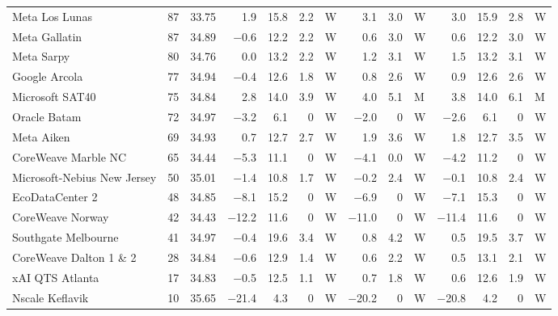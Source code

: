 {\begin{longtable}{@{}lrrrrrlrrlrrrl@{}}
Meta Los Lunas & 87 & 33.75 & 1.9 & 15.8 & 2.2 & W & 3.1 & 3.0 & W & 3.0 & 15.9 & 2.8 & W \\
Meta Gallatin & 87 & 34.89 & $-$0.6 & 12.2 & 2.2 & W & 0.6 & 3.0 & W & 0.6 & 12.2 & 3.0 & W \\
Meta Sarpy & 80 & 34.76 & 0.0 & 13.2 & 2.2 & W & 1.2 & 3.1 & W & 1.5 & 13.2 & 3.1 & W \\
Google Arcola & 77 & 34.94 & $-$0.4 & 12.6 & 1.8 & W & 0.8 & 2.6 & W & 0.9 & 12.6 & 2.6 & W \\
Microsoft SAT40 & 75 & 34.84 & 2.8 & 14.0 & 3.9 & W & 4.0 & 5.1 & M & 3.8 & 14.0 & 6.1 & M \\
Oracle Batam & 72 & 34.97 & $-$3.2 & 6.1 & 0 & W & $-$2.0 & 0 & W & $-$2.6 & 6.1 & 0 & W \\
Meta Aiken & 69 & 34.93 & 0.7 & 12.7 & 2.7 & W & 1.9 & 3.6 & W & 1.8 & 12.7 & 3.5 & W \\
CoreWeave Marble NC & 65 & 34.44 & $-$5.3 & 11.1 & 0 & W & $-$4.1 & 0.0 & W & $-$4.2 & 11.2 & 0 & W \\
Microsoft-Nebius New Jersey & 50 & 35.01 & $-$1.4 & 10.8 & 1.7 & W & $-$0.2 & 2.4 & W & $-$0.1 & 10.8 & 2.4 & W \\
EcoDataCenter 2 & 48 & 34.85 & $-$8.1 & 15.2 & 0 & W & $-$6.9 & 0 & W & $-$7.1 & 15.3 & 0 & W \\
CoreWeave Norway & 42 & 34.43 & $-$12.2 & 11.6 & 0 & W & $-$11.0 & 0 & W & $-$11.4 & 11.6 & 0 & W \\
Southgate Melbourne & 41 & 34.97 & $-$0.4 & 19.6 & 3.4 & W & 0.8 & 4.2 & W & 0.5 & 19.5 & 3.7 & W \\
CoreWeave Dalton 1 \& 2 & 28 & 34.84 & $-$0.6 & 12.9 & 1.4 & W & 0.6 & 2.2 & W & 0.5 & 13.1 & 2.1 & W \\
xAI QTS Atlanta & 17 & 34.83 & $-$0.5 & 12.5 & 1.1 & W & 0.7 & 1.8 & W & 0.6 & 12.6 & 1.9 & W \\
Nscale Keflavik & 10 & 35.65 & $-$21.4 & 4.3 & 0 & W & $-$20.2 & 0 & W & $-$20.8 & 4.2 & 0 & W \\
\end{longtable}}
